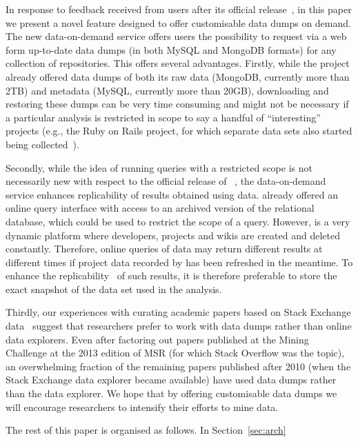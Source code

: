 In response to feedback received from \ght users after its official release~\cite{gousios2013ghtorent},
in this paper we present a novel feature designed to offer customisable data dumps on demand.
The new \ght data-on-demand service offers users the possibility to request via a web form up-to-date \ght 
data dumps (in both MySQL and MongoDB formats) for any collection of \gh repositories.
This offers several advantages.
Firstly, while the \ght project already offered data dumps of both its raw data (MongoDB, currently more than 2TB) 
and metadata (MySQL, currently more than 20GB), downloading and restoring these dumps can be 
very time consuming and might not be necessary if a particular analysis is restricted in scope to say a handful
of ``interesting'' \gh projects (e.g., the Ruby on Rails project, for which separate data sets also started being 
collected~\cite{wagstrom2013network}).

Secondly, while the idea of running queries with a restricted scope is not necessarily new with respect to
the official release of \linebreak \ght~\cite{gousios2013ghtorent}, the data-on-demand service enhances replicability
of results obtained using \ght data. 
\ght already offered an online query interface with access to an archived version of the relational database, 
which could be used to restrict the scope of a query.
However, \gh is a very dynamic platform where developers, projects and wikis are created and deleted constantly.
Therefore, online queries of \ght data may return different results at different times if project data recorded
by \ght has been refreshed in the meantime.
To enhance the replicability~\cite{gonzalez2012reproducibility} of such results, it is therefore preferable to 
store the exact snapshot of the data set used in the analysis.

Thirdly, our experiences with curating academic papers based on Stack Exchange data~\cite{vasilescu2012meta} 
suggest that researchers prefer to work with data dumps rather than online data explorers.
Even after factoring out papers published at the Mining Challenge at the 2013 edition of MSR (for which Stack 
Overflow was the topic), an overwhelming fraction of the remaining papers published after 2010 (when the Stack 
Exchange data explorer became available) have used data dumps rather than the data explorer.
We hope that by offering customisable \ght data dumps we will encourage researchers to intensify their efforts
to mine \gh data.

The rest of this paper is organised as follows.
In Section~\ref{sec:arch}

